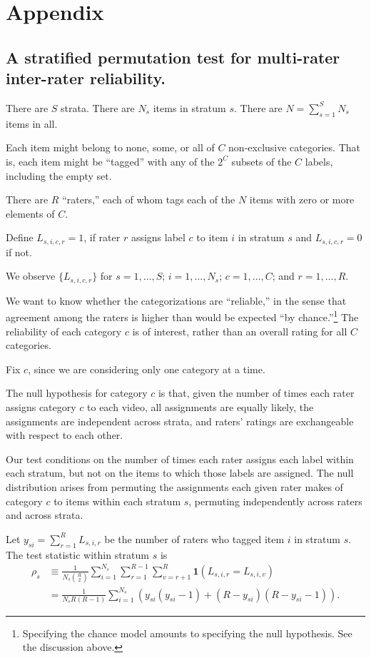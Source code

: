 \documentclass[]{article}
\begin{document}
\section*{Appendix}

\subsection*{A stratified permutation test for multi-rater inter-rater reliability.}

There are $S$ strata.
There are $N_s$ items in stratum $s$.
There are $N = \sum_{s=1}^S N_s$ items in all.

Each item might belong to none, some, or all of $C$ non-exclusive categories.
That is, each item might be ``tagged'' with any of the $2^C$ subsets
of the $C$ labels, including the empty set.

There are $R$ ``raters,'' each of whom tags each of the $N$ items with zero
or more elements of $C$.

Define $L_{s,i,c,r} = 1$, if rater $r$ assigns label $c$ to item $i$ in stratum
$s$ and $L_{s,i,c,r} = 0$ if not.

We observe $\{ L_{s,i,c,r} \}$ for $s=1, \dots, S$;  $i=1, \dots, N_s$;
$c=1, \dots, C$; and $r=1, \dots, R$.

We want to know whether the categorizations are ``reliable,'' in the sense that
agreement among the raters is higher than would be expected ``by chance.''\footnote{
   Specifying the chance model amounts to specifying the null hypothesis.
   See the discussion above.
}
The reliability of each category $c$ is of interest, rather than an overall
rating for all $C$ categories.

Fix $c$, since we are considering only one category at a time.

The null hypothesis for category $c$ is that, given the number of times
each rater assigns category $c$ to each video, all assignments
are equally likely, the assignments are independent across strata,
and raters' ratings are exchangeable with respect to
each other.

Our test conditions on the number of times each rater assigns each label within each
stratum, but not on the items to which those labels are assigned.
The null distribution arises from permuting the assignments each given rater makes
of category $c$ to items within each stratum $s$, permuting independently
across raters and across strata.

Let $y_{si} = \sum_{r=1}^R L_{s,i,r}$ be the number of raters who tagged item $i$ in stratum $s$.
The test statistic within stratum $s$ is
\begin{align*}
\rho_s &\equiv \frac{1}{N_s {R \choose 2}} \sum_{i=1}^{N_s}
              \sum_{r=1}^{R-1} \sum_{v=r+1}^R \mathbf{1}(L_{s,i,r} = L_{s,i,v}) \\
              &= \frac{1}{N_s R(R-1)} \sum_{i=1}^{N_s}
                (y_{si}(y_{si}-1) + (R-y_{si})(R-y_{si}-1)).
\end{align*}
\end{document}
